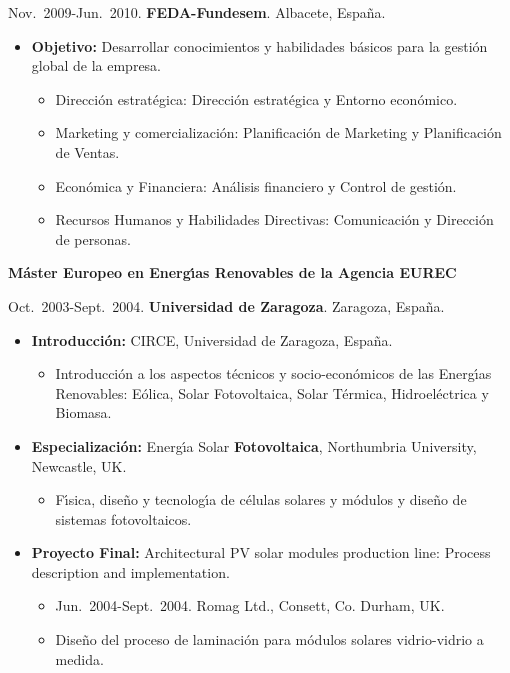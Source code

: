 \documentclass{article}
\begin{document}
\medskip
Nov.~2009-Jun.~2010. {\bf FEDA-Fundesem}. Albacete, Espa\~na.

\begin{itemize}\itemsep 0pt
\item {\bf Objetivo:} Desarrollar conocimientos y habilidades b\'asicos para la gesti\'on global de la empresa.
\begin{itemize} 
\item Direcci\'on estrat\'egica:  Direcci\'on estrat\'egica y Entorno econ\'omico.
\item Marketing y comercializaci\'on:  Planificaci\'on de Marketing y Planificaci\'on de Ventas.
\item Econ\'omica y Financiera:  An\'alisis financiero y Control de gesti\'on.
\item Recursos Humanos y Habilidades Directivas:  Comunicaci\'on y Direcci\'on de personas.
\end{itemize}
\end{itemize}


\medskip
{\bf M\'aster Europeo en Energ\'{\i}as Renovables de la Agencia EUREC}

\medskip
Oct.~2003-Sept.~2004. {\bf Universidad de Zaragoza}. Zaragoza, Espa\~na.

\begin{itemize}\itemsep 0pt
\item {\bf Introducci\'on:} CIRCE, Universidad de Zaragoza, Espa\~na.
\begin{itemize} 
\item Introducci\'on a los aspectos t\'ecnicos y socio-econ\'omicos de las Energ\'{\i}as Renovables: E\'olica, Solar Fotovoltaica, Solar T\'ermica, Hidroel\'ectrica y Biomasa.
\end{itemize}
\item {\bf Especializaci\'on:} Energ\'{\i}a Solar {\bf Fotovoltaica}, Northumbria University, Newcastle, UK.
\begin{itemize}
\item F\'{\i}sica, dise\~no y tecnolog\'{\i}a de c\'elulas solares y m\'odulos y dise\~no de sistemas fotovoltaicos.
\end{itemize}
\item {\bf Proyecto Final:} Architectural PV solar modules production line: Process description and implementation.
\begin{itemize}
\item Jun.~2004-Sept.~2004. Romag Ltd., Consett, Co. Durham, UK.
\item Dise\~no del proceso de laminaci\'on para m\'odulos solares vidrio-vidrio a medida.
\end{itemize}
\end{itemize}
\end{document}
